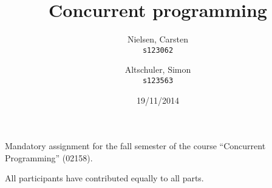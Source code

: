 \documentclass{article}
\title{Concurrent programming}
\author{
  Nielsen, Carsten\\
  \texttt{s123062}
  \and
  Altschuler, Simon\\
  \texttt{s123563}
}
\date{19/11/2014}
\begin{document}
\maketitle

\begin{center}
  Mandatory assignment for the fall semester of the course ``Concurrent Programming'' (02158).

  All participants have contributed equally to all parts.
\end{center}
\newpage

\tableofcontents
\newpage









\newpage

\end{document}
